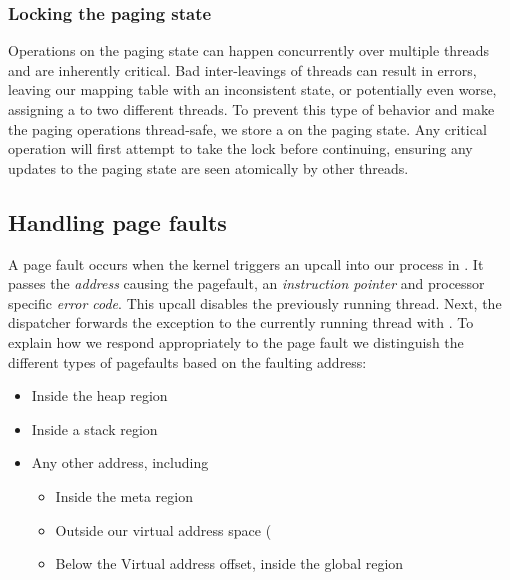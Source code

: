 \subsubsection{Locking the paging state}

Operations on the paging state can happen concurrently over multiple threads and are inherently critical. Bad inter-leavings of threads can result in errors, leaving our mapping table with an inconsistent state, or potentially even worse, assigning a  to two different threads. To prevent this type of behavior and make the paging operations thread-safe, we store a  on the paging state. Any critical operation will first attempt to take the lock before continuing, ensuring any updates to the paging state are seen atomically by other threads.











\subsection{Handling page faults} \label{page_fault_handling}

A page fault occurs when the kernel triggers an upcall into our process in . It passes the \textit{address} causing the pagefault, an \textit{instruction pointer} and processor specific \textit{error code}. This upcall disables the previously running thread. Next, the dispatcher forwards the exception to the currently running thread with . To explain how we respond appropriately to the page fault we distinguish the different types of pagefaults based on the faulting address:

\begin{itemize}
\item Inside the heap region
\item Inside a stack region
\item Any other address, including  
    \begin{itemize}
        \item Inside the meta region
        \item Outside our virtual address space (
        \item Below the Virtual address offset, inside the global region
    \end{itemize}
\end{itemize}


